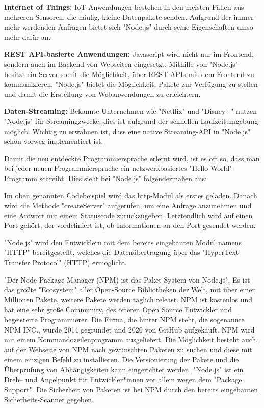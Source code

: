     \textbf{Internet of Things:}
    IoT-Anwendungen bestehen in den meisten Fällen aus mehreren Sensoren, die häufig, kleine Datenpakete senden. Aufgrund der immer mehr werdenden Anfragen bietet sich "Node.js" durch seine Eigenschaften umso mehr dafür an.

    \textbf{REST API-basierte Anwendungen:}
    Javascript wird nicht nur im Frontend, sondern auch im Backend von Webseiten eingesetzt. Mithilfe von "Node.js" besitzt ein Server somit die Möglichkeit, über REST APIs mit dem Frontend zu kommunizieren. "Node.js" bietet die Möglichkeit, Pakete zur Verfügung zu stellen und damit die Erstellung von Webanwendungen zu erleichtern. 

    \textbf{Daten-Streaming:}
    Bekannte Unternehmen wie "Netflix" und "Disney+" nutzen "Node.js" für Streamingzwecke, dies ist aufgrund der schnellen Laufzeitumgebung möglich. Wichtig zu erwähnen ist, dass eine native Streaming-API in "Node.js" schon vorweg implementiert ist.



Damit die neu entdeckte Programmiersprache erlernt wird, ist es oft so, dass man bei jeder neuen Programmiersprache ein netzwerkbasiertes "Hello World"-Programm schreibt. Dies sieht bei "Node.js" folgendermaßen aus:


Im oben genannten Codebeispiel wird das http-Modul als erstes geladen. Danach wird die Methode "createServer" aufgerufen, um eine Anfrage anzunehmen und eine Antwort mit einem Statuscode zurückzugeben. Letztendlich wird auf einen Port gehört, der vordefiniert ist, ob Informationen an den Port gesendet werden.

"Node.js" wird den Entwicklern mit dem bereits eingebauten Modul namens "HTTP" bereitgestellt, welches die Datenübertragung über das "HyperText Transfer Protocol" (HTTP) ermöglicht. \cite{HelloWorld}

\pagebreak
{}
\label{sec:npm}

"Der Node Package Manager (NPM) ist das Paket-System von Node.js". \cite{NPMIntro} Es ist das größte "Ecosystem" aller Open-Source Bibliotheken der Welt, mit über einer Millionen Pakete, weitere Pakete werden täglich releast. NPM ist kostenlos und hat eine sehr große Community, des öfteren Open Source Entwickler und begeisterte Programmierer. Die Firma, die hinter NPM steht, die sogenannte NPM INC., wurde 2014 gegründet und 2020 von GitHub aufgekauft.
NPM wird mit einem Kommandozeilenprogramm ausgeliefert. Die Möglichkeit besteht auch, auf der Webseite von NPM nach gewünschten Paketen zu suchen und diese mit einem einzigen Befehl zu installieren. Die Versionierung der Pakete und die Überprüfung von Abhängigkeiten kann eingerichtet werden. "Node.js" ist ein Dreh– und Angelpunkt für Entwickler*innen vor allem wegen dem "Package Support".
Die Sicherheit von Paketen ist bei NPM durch den bereits eingebauten Sicherheits-Scanner gegeben. \cite{NPM} \cite{NPM2} \cite{NPMIntro}


